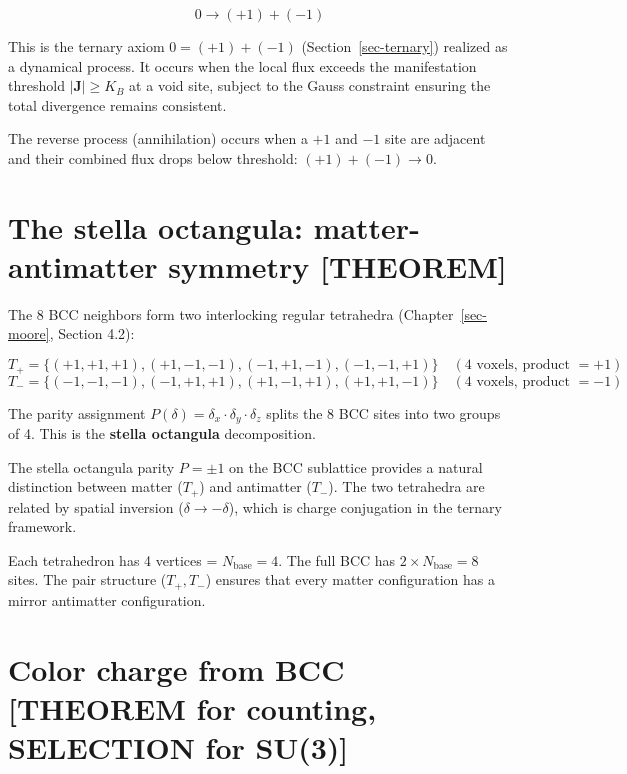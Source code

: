 \documentclass[
  11pt,
  letterpaper,
  twoside,
  openany]{book}
\makeatletter
\let\orig@section\section
\renewcommand{\section}{\needspace{8\baselineskip}\orig@section}
\makeatother
\begin{document}
\[
0 \to (+1) + (-1)
\tag{18.1}
\]

This is the ternary axiom \(0 = (+1) + (-1)\)
(Section~\ref{sec-ternary}) realized as a dynamical process. It occurs
when the local flux exceeds the manifestation threshold
\(|\mathbf{J}| \geq K_B\) at a void site, subject to the Gauss
constraint ensuring the total divergence remains consistent.

The reverse process (annihilation) occurs when a \(+1\) and \(-1\) site
are adjacent and their combined flux drops below threshold:
\((+1) + (-1) \to 0\).

\section{The stella octangula: matter-antimatter symmetry
{[}THEOREM{]}}\label{the-stella-octangula-matter-antimatter-symmetry-theorem}

The 8 BCC neighbors form two interlocking regular tetrahedra
(Chapter~\ref{sec-moore}, Section 4.2):

\[
T_+ = \{(+1,+1,+1), (+1,-1,-1), (-1,+1,-1), (-1,-1,+1)\} \quad (\text{4 voxels, product } = +1)
\] \[
T_- = \{(-1,-1,-1), (-1,+1,+1), (+1,-1,+1), (+1,+1,-1)\} \quad (\text{4 voxels, product } = -1)
\]

The parity assignment
\(P(\delta) = \delta_x \cdot \delta_y \cdot \delta_z\) splits the 8 BCC
sites into two groups of 4. This is the \textbf{stella octangula}
decomposition.

\begin{ftdtheorem}

The stella octangula parity \(P = \pm 1\) on the BCC sublattice provides
a natural distinction between matter (\(T_+\)) and antimatter (\(T_-\)).
The two tetrahedra are related by spatial inversion
(\(\delta \to -\delta\)), which is charge conjugation in the ternary
framework.

\end{ftdtheorem}

Each tetrahedron has 4 vertices = \(N_{\text{base}} = 4\). The full BCC
has \(2 \times N_{\text{base}} = 8\) sites. The pair structure
(\(T_+, T_-\)) ensures that every matter configuration has a mirror
antimatter configuration.

\section{Color charge from BCC {[}THEOREM for counting, SELECTION for
SU(3){]}}\label{color-charge-from-bcc-theorem-for-counting-selection-for-su3}
\end{document}
